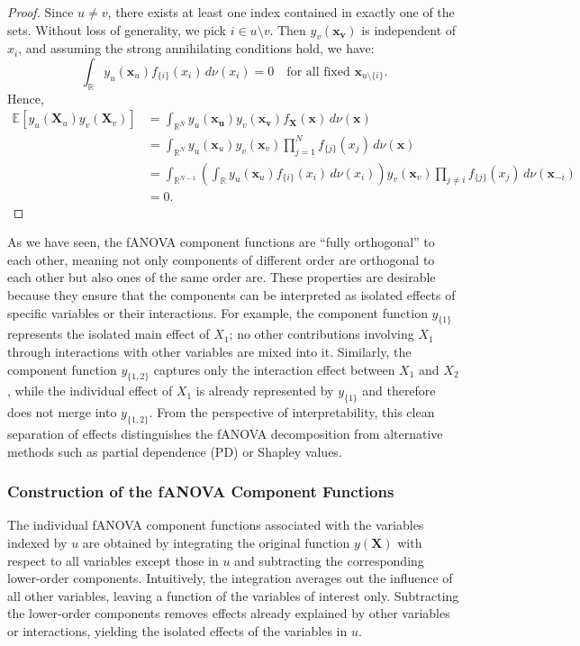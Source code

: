 \begin{proof}
Since $u \neq v$, there exists at least one index contained in exactly one of the sets.
Without loss of generality, we pick $i \in u \setminus v$.
Then $y_v(\boldsymbol{x_v})$ is independent of $x_i$, and assuming the strong annihilating conditions hold, we have:
\[
    \int_{\mathbb{R}} y_u(\boldsymbol{x}_u) f_{\{i\}}(x_i)\,d\nu(x_i) = 0
    \quad \text{for all fixed } \boldsymbol{x}_{u\setminus \{i\}}.
\]
Hence,
\begin{align*}
    \mathbb{E}[y_u(\boldsymbol{X}_u) y_v(\boldsymbol{X}_v)] &= \int_{\mathbb{R}^{N}} y_u(\boldsymbol{x_u}) y_v(\boldsymbol{x_v}) f_{\boldsymbol{X}}(\boldsymbol{x}) \, d\nu (\boldsymbol{x}) \\
    &= \int_{\mathbb{R}^{N}} y_u(\boldsymbol{x}_u) y_v(\boldsymbol{x}_v)
       \prod_{j=1}^N f_{\{j\}}(x_j)\, d\nu(\boldsymbol{x}) \\
    &= \int_{\mathbb{R}^{N-1}}
        \left(\int_{\mathbb{R}} y_u(\boldsymbol{x}_u) f_{\{i\}}(x_i)\,d\nu(x_i)\right)
        y_v(\boldsymbol{x}_v)\prod_{j \neq i} f_{\{j\}}(x_j)\,d\nu(\boldsymbol{x}_{-i})\\
    &= 0.
\end{align*}
\end{proof}


As we have seen, the fANOVA component functions are ``fully orthogonal'' to each other, meaning not only components of different order are orthogonal to each other but also ones of the same order are.
These properties are desirable because they ensure that the components can be interpreted as 
isolated effects of specific variables or their interactions. 
For example, the component function $y_{\{1\}}$ represents the 
isolated main effect of $X_1$; no other contributions 
involving $X_1$ through interactions with other variables are mixed into it. 
Similarly, the component function $y_{\{1,2\}}$ captures only the 
interaction effect between $X_1$ and $X_2$, while the individual effect 
of $X_1$ is already represented by $y_{\{1\}}$ and therefore does not 
merge into $y_{\{1,2\}}$. 
From the perspective of interpretability, this clean separation of effects 
distinguishes the fANOVA decomposition from alternative methods such as 
partial dependence (PD) or Shapley values.

\subsubsection{Construction of the fANOVA Component Functions}
The individual fANOVA component functions associated with the variables 
indexed by $u$ are obtained by integrating the original function 
$y(\boldsymbol{X})$ with respect to all variables except those in $u$ and 
subtracting the corresponding lower-order components. 
Intuitively, the integration averages out the influence of all other variables, 
leaving a function of the variables of interest only. 
Subtracting the lower-order components removes effects already explained by 
other variables or interactions, yielding the isolated effects of the variables in $u$. 

